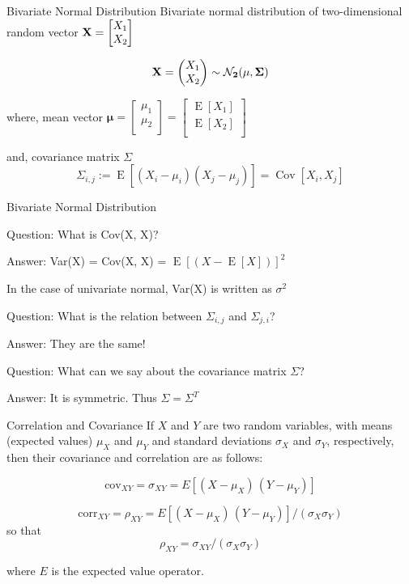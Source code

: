 \documentclass{beamer}
\begin{document}
\begin{frame}{Bivariate Normal Distribution}
Bivariate normal distribution of two-dimensional random vector $\bf{X} =\begin{bmatrix}
X_{1} \\
X_{2} \\
\end{bmatrix}
$

\begin{gather}
	\bf{X} = \begin{pmatrix}
	X_1 \\
	X_2
	\end{pmatrix} \sim \mathcal{N}_2 (\mu , \Sigma)
\end{gather}

where, mean vector $\bm{\mu} =\begin{bmatrix}
\mu_{1} \\
\mu_{2} \\
\end{bmatrix}
=\begin{bmatrix}
\operatorname{E}[X_{1}] \\
\operatorname{E}[X_{2}] \\
\end{bmatrix}
$

and, covariance matrix $\Sigma$
$$\Sigma_{i,j} := \operatorname{E} [(X_i - \mu_i)( X_j - \mu_j)] = \operatorname{Cov}[X_i, X_j] $$
\end{frame}

\begin{frame}{Bivariate Normal Distribution}

Question: What is Cov(X, X)?

Answer: Var(X) = Cov(X, X) =  $\operatorname{E}[(X - \operatorname{E}[X])]^2$

In the case of univariate normal, Var(X) is written as $\sigma^2$

Question: What is the relation between $\Sigma_{i, j}$ and $\Sigma_{j, i}$?

Answer: They are the same!

Question: What can we say about the covariance matrix $\Sigma$?

Answer: It is symmetric. Thus $\Sigma = \Sigma^T$
\end{frame}

\begin{frame}{Correlation and Covariance}
If $X$ and $Y$ are two random variables, with means (expected values) $\mu_X$ and $\mu_Y$ and standard deviations $\sigma_X$ and $\sigma_Y$, respectively, then their covariance and correlation are as follows:

$$\text{cov}_{XY} = \sigma_{XY} = E[(X-\mu_X)\,(Y-\mu_Y)] $$

$$	\text{corr}_{XY} = \rho_{XY} = E[(X-\mu_X)\,(Y-\mu_Y)]/(\sigma_X \sigma_Y)
$$
so that
$$
\rho_{XY} = \sigma_{XY} / (\sigma_X \sigma_Y) $$

where $E$ is the expected value operator. 
\end{frame}
\end{document}

